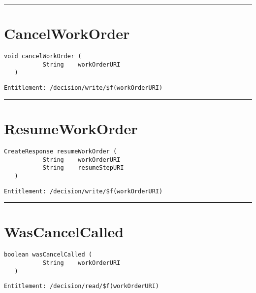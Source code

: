\rule{12cm}{2pt}
\section{CancelWorkOrder}
\label{Api:CancelWorkOrder}
\begin{lstlisting}[style=nonumbers]
   void cancelWorkOrder (
           String    workOrderURI
   )
\end{lstlisting}
\begin{Verbatim}[formatcom=\color{Maroon}]
  Entitlement: /decision/write/$f(workOrderURI)
\end{Verbatim}



\rule{12cm}{2pt}
\section{ResumeWorkOrder}
\label{Api:ResumeWorkOrder}
\begin{lstlisting}[style=nonumbers]
   CreateResponse resumeWorkOrder (
           String    workOrderURI
           String    resumeStepURI
   )
\end{lstlisting}
\begin{Verbatim}[formatcom=\color{Maroon}]
  Entitlement: /decision/write/$f(workOrderURI)
\end{Verbatim}



\rule{12cm}{2pt}
\section{WasCancelCalled}
\label{Api:WasCancelCalled}
\begin{lstlisting}[style=nonumbers]
   boolean wasCancelCalled (
           String    workOrderURI
   )
\end{lstlisting}
\begin{Verbatim}[formatcom=\color{Maroon}]
  Entitlement: /decision/read/$f(workOrderURI)
\end{Verbatim}



